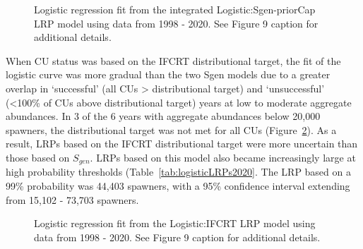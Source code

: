\documentclass[11pt]{book}
\begin{document}
\begin{figure}[htb]

{\centering {} 

}

\caption{Logistic regression fit from the integrated Logistic:Sgen-priorCap LRP model using data from 1998 - 2020. See Figure 9 caption for additional details.}\label{fig:coho-IMCap-logisticFit2020}
\end{figure}
When CU status was based on the IFCRT distributional target, the fit of the logistic curve was more gradual than the two Sgen models due to a greater overlap in `successful' (all CUs \textgreater{} distributional target) and `unsuccessful' (\textless100\% of CUs above distributional target) years at low to moderate aggregate abundances. In 3 of the 6 years with aggregate abundances below 20,000 spawners, the distributional target was not met for all CUs (Figure~\ref{fig:coho-Distr-logisticFit2020}). As a result, LRPs based on the IFCRT distributional target were more uncertain than those based on \(S_{gen}\). LRPs based on this model also became increasingly large at high probability thresholds (Table~\ref{tab:logisticLRPs2020}. The LRP based on a 99\% probability was 44,403 spawners, with a 95\% confidence interval extending from 15,102 - 73,703 spawners.
\begin{figure}[htb]

{\centering {} 

}

\caption{Logistic regression fit from the Logistic:IFCRT LRP model using data from 1998 - 2020. See Figure 9 caption for additional details.}\label{fig:coho-Distr-logisticFit2020}
\end{figure}
\end{document}
